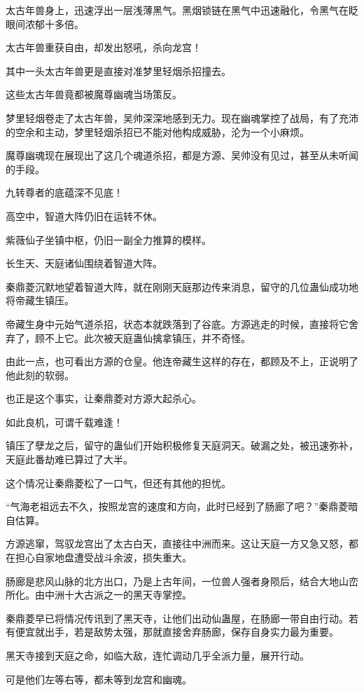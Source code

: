\begin{this_body}
太古年兽身上，迅速浮出一层浅薄黑气。黑烟锁链在黑气中迅速融化，令黑气在眨眼间浓郁十多倍。

太古年兽重获自由，却发出怒吼，杀向龙宫！

其中一头太古年兽更是直接对准梦里轻烟杀招撞去。

这些太古年兽竟都被魔尊幽魂当场策反。

梦里轻烟卷走了太古年兽，吴帅深深地感到无力。现在幽魂掌控了战局，有了充沛的空余和主动，梦里轻烟杀招已不能对他构成威胁，沦为一个小麻烦。

魔尊幽魂现在展现出了这几个魂道杀招，都是方源、吴帅没有见过，甚至从未听闻的手段。

九转尊者的底蕴深不见底！

高空中，智道大阵仍旧在运转不休。

紫薇仙子坐镇中枢，仍旧一副全力推算的模样。

长生天、天庭诸仙围绕着智道大阵。

秦鼎菱沉默地望着智道大阵，就在刚刚天庭那边传来消息，留守的几位蛊仙成功地将帝藏生镇压。

帝藏生身中元始气道杀招，状态本就跌落到了谷底。方源逃走的时候，直接将它舍弃了，顾不上它。此次被天庭蛊仙擒拿镇压，并不奇怪。

由此一点，也可看出方源的仓皇。他连帝藏生这样的存在，都顾及不上，正说明了他此刻的软弱。

也正是这个事实，让秦鼎菱对方源大起杀心。

如此良机，可谓千载难逢！

镇压了孽龙之后，留守的蛊仙们开始积极修复天庭洞天。破漏之处，被迅速弥补，天庭此番劫难已算过了大半。

这个情况让秦鼎菱松了一口气，但还有其他的担忧。

“气海老祖远去不久，按照龙宫的速度和方向，此时已经到了肠廊了吧？”秦鼎菱暗自估算。

方源逃窜，驾驭龙宫出了太古白天，直接往中洲而来。这让天庭一方又急又怒，都在担心自家地盘遭受战斗余波，损失重大。

肠廊是悲风山脉的北方出口，乃是上古年间，一位兽人强者身陨后，结合大地山峦所化。由中洲十大古派之一的黑天寺掌控。

秦鼎菱早已将情况传讯到了黑天寺，让他们出动仙蛊屋，在肠廊一带自由行动。若有便宜就出手，若是敌势太强，那就直接舍弃肠廊，保存自身实力最为重要。

黑天寺接到天庭之命，如临大敌，连忙调动几乎全派力量，展开行动。

可是他们左等右等，都未等到龙宫和幽魂。


\end{this_body}
